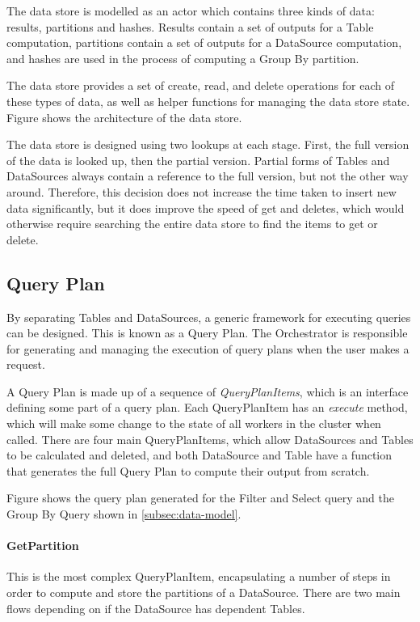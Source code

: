 The data store is modelled as an actor which contains three kinds of data: results, partitions and hashes. Results contain a set of outputs for a Table computation, partitions contain a set of outputs for a DataSource computation, and hashes are used in the process of computing a Group By partition.

The data store provides a set of create, read, and delete operations for each of these types of data, as well as helper functions for managing the data store state. Figure  shows the architecture of the data store. 


The data store is designed using two lookups at each stage. First, the full version of the data is looked up, then the partial version. Partial forms of Tables and DataSources always contain a reference to the full version, but not the other way around. Therefore, this decision does not increase the time taken to insert new data significantly, but it does improve the speed of get and deletes, which would otherwise require searching the entire data store to find the items to get or delete.

\subsection{Query Plan}
By separating Tables and DataSources, a generic framework for executing queries can be designed. This is known as a Query Plan. The Orchestrator is responsible for generating and managing the execution of query plans when the user makes a request. 

A Query Plan is made up of a sequence of \textit{QueryPlanItems}, which is an interface defining some part of a query plan. Each QueryPlanItem has an \textit{execute} method, which will make some change to the state of all workers in the cluster when called. There are four main QueryPlanItems, which allow DataSources and Tables to be calculated and deleted, and both DataSource and Table have a function that generates the full Query Plan to compute their output from scratch.

Figure  shows the query plan generated for the Filter and Select query and the Group By Query shown in \ref{subsec:data-model}.


\paragraph{GetPartition}
This is the most complex QueryPlanItem, encapsulating a number of steps in order to compute and store the partitions of a DataSource. There are two main flows depending on if the DataSource has dependent Tables.

